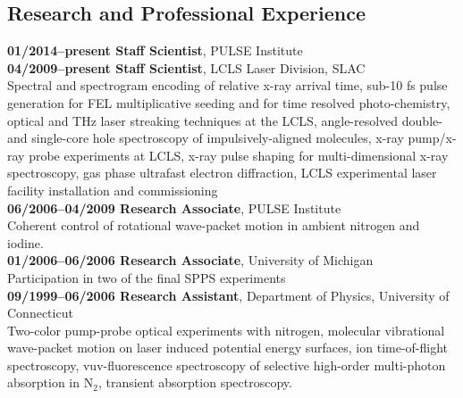 \documentclass[letterpaper,oneside,11pt]{article}
\begin{document}
\subsection*{Research and Professional Experience}
\textbf{01/2014--present Staff Scientist}, PULSE Institute\\
\textbf{04/2009--present Staff Scientist}, LCLS Laser Division, SLAC\\
Spectral and spectrogram encoding of relative x-ray arrival time, 
sub-10 fs pulse generation for FEL multiplicative seeding and for time resolved photo-chemistry, 
optical and THz laser streaking techniques at the LCLS, 
angle-resolved double- and single-core hole spectroscopy of impulsively-aligned molecules, 
x-ray pump/x-ray probe experiments at LCLS, 
x-ray pulse shaping for multi-dimensional x-ray spectroscopy, 
gas phase ultrafast electron diffraction, 
LCLS experimental laser facility installation and commissioning\\
\textbf{06/2006--04/2009 Research Associate}, PULSE Institute\\
Coherent control of rotational wave-packet motion in ambient nitrogen and iodine.\\
\textbf{01/2006--06/2006 Research Associate}, University of Michigan\\
Participation in two of the final SPPS experiments\\
\textbf{09/1999--06/2006 Research Assistant}, Department of Physics, University of Connecticut\\
Two-color pump-probe optical experiments with nitrogen, 
molecular vibrational wave-packet motion on laser induced potential energy surfaces, 
ion time-of-flight spectroscopy, 
vuv-fluorescence spectroscopy of selective high-order multi-photon absorption in N$_2$, 
transient absorption spectroscopy.

\end{document}
